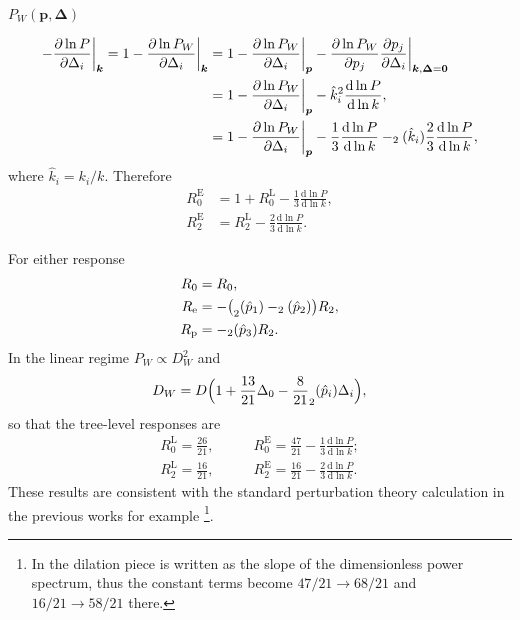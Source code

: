 \documentclass[a4paper,11pt]{article}
\let\L\relax
\DeclareMathOperator{\L}{\mathcal{L}}
\renewcommand{\d}{\mathrm{d}}
\newcommand{\vk}{{\bm k}}
\newcommand{\vp}{{\bm p}}
\newcommand{\vDelta}{{\bm\Delta}}
\newcommand{\Euler}{\mathrm{E}}
\newcommand{\Lagrange}{\mathrm{L}}
\begin{document}
$P_W(\vp, \vDelta)$

\begin{align}
    - \frac{\partial\ln P}{\partial\Delta_i} \bigg|_\vk
    = 1 - \frac{\partial\ln P_W}{\partial\Delta_i} \bigg|_\vk
    &= 1 - \frac{\partial\ln P_W}{\partial\Delta_i} \bigg|_\vp
    - \frac{\partial\ln P_W}{\partial p_j}
        \frac{\partial p_j}{\partial \Delta_i} \bigg|_{\vk, \vDelta=\bm0}
    \nonumber\\
    &= 1 - \frac{\partial\ln P_W}{\partial\Delta_i} \bigg|_\vp
    - \hat k_i^2 \frac{\d\ln P}{\d\ln k}, \nonumber\\
    &= 1 - \frac{\partial\ln P_W}{\partial\Delta_i} \bigg|_\vp
    - \frac13 \frac{\d\ln P}{\d\ln k}
    - \L_2(\hat k_i) \frac23 \frac{\d\ln P}{\d\ln k},
\end{align}
where $\hat k_i = k_i / k$.
Therefore
\begin{align}
    R^\Euler_0 &= 1 + R^\Lagrange_0 - \frac13 \frac{\d\ln P}{\d\ln k},
    \nonumber\\
    R^\Euler_2 &= R^\Lagrange_2 - \frac23 \frac{\d\ln P}{\d\ln k}.
\end{align}

For either response
\begin{align}
    R_0 &= R_0, \nonumber\\
    R_\mathrm{e}
    &= - \bigl(\L_2(\hat p_1) - \L_2(\hat p_2)\bigr) R_2, \nonumber\\
    R_\mathrm{p} &= - \L_2(\hat p_3) R_2.
\end{align}
In the linear regime $P_W \propto D_W^2$ and
\begin{equation}
    D_W = D \Bigl( 1 + \frac{13}{21} \Delta_0
    - \frac8{21} \L_2(\hat p_i) \Delta_i \Bigr),
    \label{DW}
\end{equation}
so that the tree-level responses are
\begin{align}
    R^\Lagrange_0 = \frac{26}{21}, \qquad
    & R^\Euler_0 = \frac{47}{21} - \frac13 \frac{\d\ln P}{\d\ln k};
    \nonumber\\
    R^\Lagrange_2 = \frac{16}{21}, \qquad
    & R^\Euler_2 = \frac{16}{21} - \frac23 \frac{\d\ln P}{\d\ln k}.
\end{align}
These results are consistent with the standard perturbation theory calculation
in the previous works for example \cite{LiSchmittfullSeljak17}\footnote{In
\cite{LiSchmittfullSeljak17} the dilation piece is written as the slope of the
dimensionless power spectrum, thus the constant terms become $47/21 \to 68/21$
and $16/21 \to 58/21$ there.}.
\end{document}
